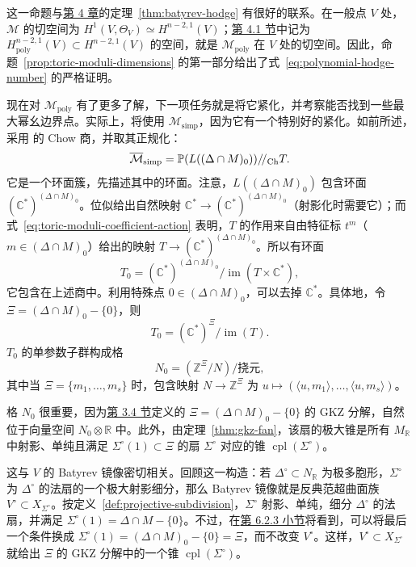 这一命题与\hyperref[chap:mirror-constructions]{第 4 章}的定理~\ref{thm:batyrev-hodge} 有很好的联系。在一般点 $V$ 处，$\mathcal M$ 的切空间为 $H^1(V,\Theta_V)\simeq H^{n-2,1}(V)$；\hyperref[sec:batyrev-mirror]{第 4.1 节}中记为 $H_{\mathrm{poly}}^{n-2,1}(V)\subset H^{n-2,1}(V)$ 的空间，就是 $\mathcal M_{\mathrm{poly}}$ 在 $V$ 处的切空间。因此，命题~\ref{prop:toric-moduli-dimensions} 的第一部分给出了式~\eqref{eq:polynomial-hodge-number} 的严格证明。

现在对 $\mathcal M_{\mathrm{poly}}$ 有了更多了解，下一项任务就是将它紧化，并考察能否找到一些最大幂幺边界点。实际上，将使用 $\mathcal M_{\mathrm{simp}}$，因为它有一个特别好的紧化。如前所述，采用  的 Chow 商，并取其正规化：
\begin{equation}\label{eq:moduli-chow-quotient}\index{Chow 商!正规化|hyperpage}
\overline{\mathcal M}_{\mathrm{simp}}=\mathbb P(L((\Delta\cap M)_0))/\!/_{\mathrm{Ch}}T.
\end{equation}
它是一个环面簇，先描述其中的环面。注意，$L((\Delta\cap M)_0)$ 包含环面 $(\mathbb C^*)^{(\Delta\cap M)_0}$。位似给出自然映射 $\mathbb C^*\to(\mathbb C^*)^{(\Delta\cap M)_0}$（射影化时需要它）；而式~\eqref{eq:toric-moduli-coefficient-action} 表明，$T$ 的作用来自由特征标 $t^m$（$m\in(\Delta\cap M)_0$）给出的映射 $T\to(\mathbb C^*)^{(\Delta\cap M)_0}$。所以有环面
\begin{equation}\label{eq:moduli-quotient-torus}
T_0=(\mathbb C^*)^{(\Delta\cap M)_0}/\operatorname{im}(T\times\mathbb C^*),
\end{equation}
它包含在上述商中。利用特殊点 $0\in(\Delta\cap M)_0$，可以去掉 $\mathbb C^*$。具体地，令 $\Xi=(\Delta\cap M)_0-\{0\}$，则
\[
T_0=(\mathbb C^*)^\Xi/\operatorname{im}(T).
\]
$T_0$ 的单参数子群构成格
\begin{equation}\label{eq:moduli-quotient-lattice}
N_0=(\mathbb Z^\Xi/N)/\text{挠元},
\end{equation}
其中当 $\Xi=\{m_1,\ldots,m_s\}$ 时，包含映射 $N\to\mathbb Z^\Xi$ 为 $u\mapsto(\langle u,m_1\rangle,\ldots,\langle u,m_s\rangle)$。

格 $N_0$ 很重要，因为\hyperref[sec:gkz-decomposition]{第 3.4 节}定义的 $\Xi=(\Delta\cap M)_0-\{0\}$ 的 GKZ 分解，自然位于向量空间 $N_0\otimes\mathbb R$ 中。此外，由定理~\ref{thm:gkz-fan}，该扇的极大锥是所有 $M_{\mathbb R}$ 中射影、单纯且满足 $\Sigma^\circ(1)\subset\Xi$ 的扇 $\Sigma^\circ$ 对应的锥 $\operatorname{cpl}(\Sigma^\circ)$。

这与 $V$ 的 Batyrev 镜像密切相关。回顾这一构造：若 $\Delta^\circ\subset N_{\mathbb R}$ 为极多胞形，$\Sigma^\circ$ 为 $\Delta^\circ$ 的法扇的一个极大射影细分，那么 Batyrev 镜像就是反典范超曲面族 $V^\circ\subset X_{\Sigma^\circ}$。按定义~\ref{def:projective-subdivision}，$\Sigma^\circ$ 射影、单纯，细分 $\Delta^\circ$ 的法扇，并满足 $\Sigma^\circ(1)=\Delta\cap M-\{0\}$。不过，在\hyperref[subsec:enlarged-kahler-moduli]{第 6.2.3 小节}将看到，可以将最后一个条件换成
$\Sigma^\circ(1)=(\Delta\cap M)_0-\{0\}=\Xi$，而不改变 $V^\circ$。这样，$V^\circ\subset X_{\Sigma^\circ}$ 就给出 $\Xi$ 的 GKZ 分解中的一个锥 $\operatorname{cpl}(\Sigma^\circ)$。

